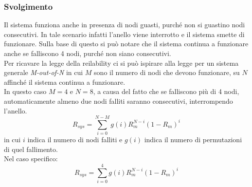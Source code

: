 \subsubsection{Svolgimento}
Il sistema funziona anche in presenza di nodi guasti, purché non si guastino nodi consecutivi. In tale scenario infatti l'anello viene interrotto e il sistema smette di funzionare. Sulla base di questo si può notare che il sistema continua a funzionare anche se falliscono 4 nodi, purché non siano consecutivi.
\\Per ricavare la legge della reilability ci si può ispirare alla legge per un sistema generale \textit{M-out-of-N} in cui $M$ sono il numero di nodi che devono funzionare, su $N$ affinché il sistema continua a funzionare.
\\In questo caso $M=4$ e $N=8$, a causa del fatto che se falliscono più di 4 nodi, automaticamente almeno due nodi falliti saranno consecutivi, interrompendo l'anello.
\begin{equation*}
	R_{sys} = \sum_{i=0}^{N-M}g(i)R_m^{N-i}(1-R_m)^i
\end{equation*}
in cui $i$ indica il numero di nodi falliti e $g(i)$ indica il numero di permutazioni di quel fallimento.
\\Nel caso specifico:
\begin{equation*}
	R_{sys} = \sum_{i=0}^{4}g(i)R_m^{N-i}(1-R_m)^i
\end{equation*}
